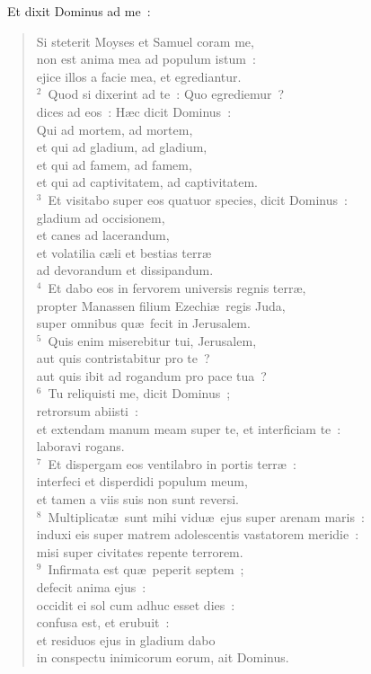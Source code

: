 ~Et dixit Dominus ad me~: \begin{flushleft}\begin{verse}\vspace{6pt}Si steterit Moyses et Samuel coram me,\\ non est anima mea ad populum istum~:\\ ejice illos a facie mea, et egrediantur.\\
${}^{2}$~Quod si dixerint ad te~: Quo egrediemur~?\\ dices ad eos~: H\ae c dicit Dominus~:\\ Qui ad mortem, ad mortem,\\ et qui ad gladium, ad gladium,\\ et qui ad famem, ad famem,\\ et qui ad captivitatem, ad captivitatem.\\
${}^{3}$~Et visitabo super eos quatuor species, dicit Dominus~:\\ gladium ad occisionem,\\ et canes ad lacerandum,\\ et volatilia c\ae li et bestias terr\ae \\ ad devorandum et dissipandum.\\
${}^{4}$~Et dabo eos in fervorem universis regnis terr\ae ,\\ propter Manassen filium Ezechi\ae\ regis Juda,\\ super omnibus qu\ae\ fecit in Jerusalem.\\
${}^{5}$~Quis enim miserebitur tui, Jerusalem,\\ aut quis contristabitur pro te~?\\ aut quis ibit ad rogandum pro pace tua~?\\
${}^{6}$~Tu reliquisti me, dicit Dominus~;\\ retrorsum abiisti~:\\ et extendam manum meam super te, et interficiam te~:\\ laboravi rogans.\\
${}^{7}$~Et dispergam eos ventilabro in portis terr\ae~:\\ interfeci et disperdidi populum meum,\\ et tamen a viis suis non sunt reversi.\\
${}^{8}$~Multiplicat\ae\ sunt mihi vidu\ae\ ejus super arenam maris~:\\ induxi eis super matrem adolescentis vastatorem meridie~:\\ misi super civitates repente terrorem.\\
${}^{9}$~Infirmata est qu\ae\ peperit septem~;\\ defecit anima ejus~:\\ occidit ei sol cum adhuc esset dies~:\\ confusa est, et erubuit~:\\ et residuos ejus in gladium dabo\\ in conspectu inimicorum eorum, ait Dominus.\end{verse}\end{flushleft}


